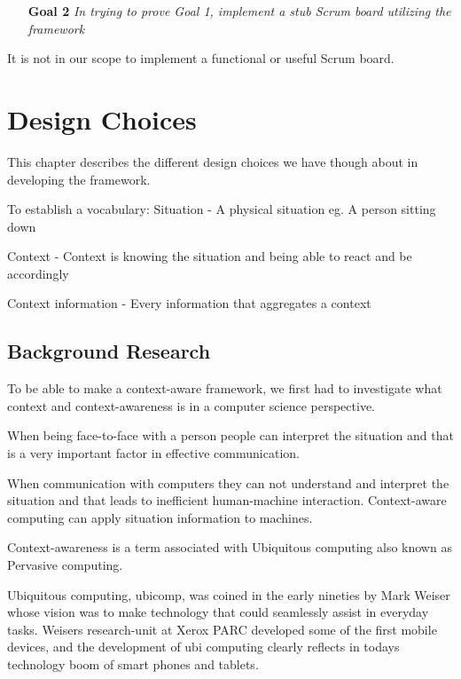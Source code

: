 \documentclass[]{report}
\begin{document}
\begin{itemize}
\item[\textbf{Goal 2 }] \textit{In trying to prove Goal 1, implement a stub Scrum board utilizing the framework}
\end{itemize}

It is not in our scope to implement a functional or useful Scrum board.











  

\chapter{Design Choices}

This chapter describes the different design choices we have though about in developing the framework.

To establish a vocabulary:
	Situation - A physical situation eg. A person sitting down
	
	Context - Context is knowing the situation and being able to react and be accordingly
	
	Context information - Every information that aggregates a context
	

\section{Background Research}
To be able to make a context-aware framework, we first had to investigate what context and context-awareness is in a computer science perspective.


When being face-to-face with a person people can interpret the situation and that is a very important factor in effective communication. 

When communication with computers they can not understand and interpret the situation and that leads to inefficient human-machine interaction. Context-aware computing can apply situation information to machines.

Context-awareness is a term associated with Ubiquitous computing also known as Pervasive computing.

Ubiquitous computing, ubicomp, was coined in the early nineties by Mark Weiser whose vision was to make technology that could seamlessly assist in everyday tasks. Weisers research-unit at Xerox PARC developed some of the first mobile devices, and the development of ubi computing clearly reflects in todays technology boom of smart phones and tablets.
\end{document}

